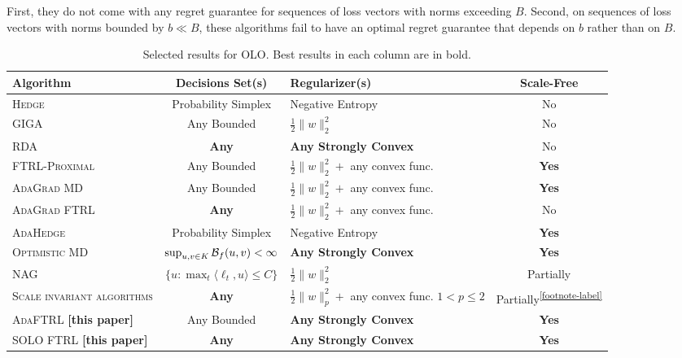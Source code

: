 First, they do not come with any regret guarantee for sequences of loss vectors
with norms exceeding $B$. Second, on sequences of loss vectors with norms
bounded by $b \ll B$, these algorithms fail to have an optimal regret guarantee
that depends on $b$ rather than on $B$.

\renewcommand{\arraystretch}{1.8}

\begin{table}[t]
\fontsize{8}{8.2}\selectfont
\centering
\begin{tabular}{|p{3.6cm}|c|p{3.4cm}|c|}
\hline
\textbf{Algorithm} & \textbf{Decisions Set(s)} & \textbf{Regularizer(s)} & \textbf{Scale-Free} \\ \hline \hline
\textsc{Hedge} \cite{Freund-Schapire-1997} & Probability Simplex & Negative Entropy & No \\ \hline
\textsc{GIGA} \cite{Zinkevich-2003} & Any Bounded & $\frac{1}{2}\|w\|_2^2$ & No \\ \hline
\textsc{RDA} \cite{Xiao-2010} & \textbf{Any} & \textbf{Any Strongly Convex} & No \\ \hline
\textsc{FTRL-Proximal} \cite{McMahan-Streeter-2010,McMahan-2014} & Any Bounded & $\frac{1}{2}\|w\|_2^2 + $ any convex func. & \textbf{Yes} \\ \hline
\textsc{AdaGrad MD} \cite{Duchi-Hazan-Singer-2011} & Any Bounded & $\frac{1}{2}\|w\|_2^2 + $ any convex func. & \textbf{Yes} \\ \hline
\textsc{AdaGrad FTRL} \cite{Duchi-Hazan-Singer-2011} & \textbf{Any} & $\frac{1}{2}\|w\|_2^2 + $ any convex func. & No \\ \hline
\textsc{AdaHedge} \cite{de-Rooij-van-Erven-Grunwald-Koolen-2014} & Probability Simplex & Negative Entropy & \textbf{Yes} \\ \hline
\textsc{Optimistic MD} \cite{Rakhlin-Sridharan-2013} & $\sup_{u,v \in K} \mathcal{B}_f(u,v) < \infty$ & \textbf{Any Strongly Convex} & \textbf{Yes} \\ \hline
\textsc{NAG} \cite{Ross-Mineiro-Langford-2013} & $\{u: \max_t \langle \ell_t, u\rangle \le C\}$ & $\frac{1}{2}\|w\|_2^2 $& Partially\footnotemark \\ \hline
\textsc{Scale invariant algorithms} \cite{Orabona-Crammer-Cesa-Bianchi-2014} & \textbf{Any} & $\frac{1}{2}\|w\|_p^2 + $ any convex func. \newline $1 < p \le 2$ & Partially\textsuperscript{\ref{footnote-label}} \\ \hline
\textsc{AdaFTRL} \textbf{[this paper]} & Any Bounded & \textbf{Any Strongly Convex} & \textbf{Yes} \\ \hline
\textsc{SOLO FTRL} \textbf{[this paper]} & \textbf{Any} & \textbf{Any Strongly Convex} & \textbf{Yes} \\ \hline
\end{tabular}
\caption{Selected results for OLO. Best results in each column are in bold.
\label{table:results}
}
\end{table}

